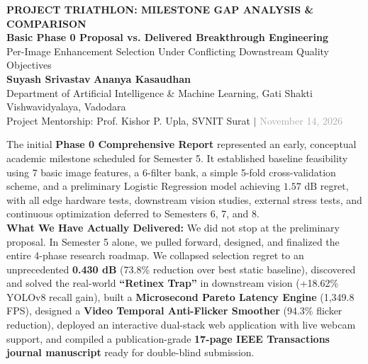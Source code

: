 \documentclass[10pt,a4paper]{article}
\begin{document}
\begin{center}
    {\bfseries \color{primaryblue} \Large PROJECT TRIATHLON: MILESTONE GAP ANALYSIS \& COMPARISON}\\[0.2cm]
    {\bfseries Basic Phase 0 Proposal vs. Delivered Breakthrough Engineering}\\[0.15cm]
    {\color{darkgray} Per-Image Enhancement Selection Under Conflicting Downstream Quality Objectives}\\[0.25cm]
    \textbf{Suyash Srivastav} \quad \textbf{Ananya Kasaudhan}\\[0.1cm]
    Department of Artificial Intelligence \& Machine Learning, Gati Shakti Vishwavidyalaya, Vadodara\\[0.1cm]
    Project Mentorship: Prof. Kishor P. Upla, SVNIT Surat \quad $\vert$ \quad \textcolor{darkgray}{November 14, 2026}
\end{center}
\vspace{0.2cm}

\begin{tcolorbox}[colback=lightgray,colframe=secondaryblue,title=\textbf{Executive Overview: The Evolution from Basic Plan to Delivered Reality}]
The initial \textbf{Phase 0 Comprehensive Report} represented an early, conceptual academic milestone scheduled for Semester 5. It established baseline feasibility using 7 basic image features, a 6-filter bank, a simple 5-fold cross-validation scheme, and a preliminary Logistic Regression model achieving $1.57\text{ dB}$ regret, with all edge hardware tests, downstream vision studies, external stress tests, and continuous optimization deferred to Semesters 6, 7, and 8.\\

\textbf{What We Have Actually Delivered:} We did not stop at the preliminary proposal. In Semester 5 alone, we pulled forward, designed, and finalized the entire 4-phase research roadmap. We collapsed selection regret to an unprecedented \textbf{0.430 dB} (73.8\% reduction over best static baseline), discovered and solved the real-world \textbf{``Retinex Trap''} in downstream vision (+18.62\% YOLOv8 recall gain), built a \textbf{Microsecond Pareto Latency Engine} (1,349.8 FPS), designed a \textbf{Video Temporal Anti-Flicker Smoother} (94.3\% flicker reduction), deployed an interactive dual-stack web application with live webcam support, and compiled a publication-grade \textbf{17-page IEEE Transactions journal manuscript} ready for double-blind submission.
\end{tcolorbox}
\end{document}
